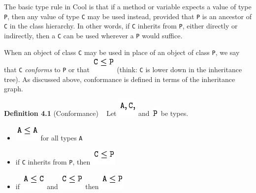 \documentclass[]{article}
\begin{document}
The basic type rule in Cool is that if a method or variable expects a
value of type \texttt{P}, then any value of type \texttt{C} may be used
instead, provided that \texttt{P} is an ancestor of \texttt{C} in the
class hierarchy. In other words, if \texttt{C} inherits from \texttt{P},
either directly or indirectly, then a \texttt{C} can be used wherever a
\texttt{P} would suffice.

When an object of class \texttt{C} may be used in place of an object of
class \texttt{P}, we say that \texttt{C} \emph{conforms} to \texttt{P}
or that \includegraphics{img1.png} (think: \texttt{C} is lower down in
the inheritance tree). As discussed above, conformance is defined in
terms of the inheritance graph.

\textbf{Definition 4.1} (Conformance) ~ Let \includegraphics{img2.png}
and \includegraphics{img3.png} be types.

\begin{itemize}
\itemsep1pt\parskip0pt
\item
  \includegraphics{img4.png} for all types \texttt{A}
\item
  if \texttt{C} inherits from \texttt{P}, then
  \includegraphics{img1.png}
\item
  if \includegraphics{img5.png} and \includegraphics{img1.png} then
  \includegraphics{img6.png}
\end{itemize}
\end{document}
